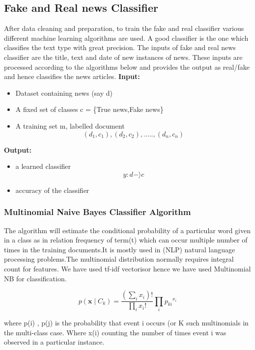 \documentclass[runningheads]{llncs}
\begin{document}
\subsection{Fake and Real news Classifier}
After data cleaning and preparation, to train the fake and real classifier various different machine learning algorithms are used. A good classifier is the one which classifies the text type with great precision. The inputs of fake and real news classifier are the title, text and date of new instances of news. These inputs are processed according to the algorithms below and provides the output as real/fake and hence classifies the news articles.
\newline
\newline
\textbf{Input:}
\newline
\begin{itemize}
  \item Dataset containing news (say d)
  \item A fixed set of classes c = \{True news,Fake news\}
  \item A training set m, labelled document \[(d_1,c_1),(d_2,c_2), ..... , (d_n,c_n)\]
\end{itemize}
\textbf{Output:}
\newline
\begin{itemize}
  \item a learned classifier \[y: d -\rangle c\]
  \item accuracy of the classifier
\end{itemize}

\subsubsection{Multinomial Naive Bayes Classifier Algorithm}

The algorithm will estimate the conditional probability of a particular word given in a class as in relation frequency of term(t) which can occur multiple number of times in the training documents.It is mostly used in (NLP) natural language processing problems.The multinomial distribution normally requires integral count for features. We have used tf-idf vectorisor hence we have used Multinomial NB for classification.


\[{\displaystyle p(\mathbf {x} \mid C_{k})={\frac {(\sum _{i}x_{i})!}{\prod _{i}x_{i}!}}\prod _{i}{p_{ki}}^{x_{i}}}\]

\newline
where p(i) , p(j) is the probability that event i occurs (or K such multinomials in the multi-class case. Where x(i) counting the number of times event i was observed in a particular instance.
\end{document}

